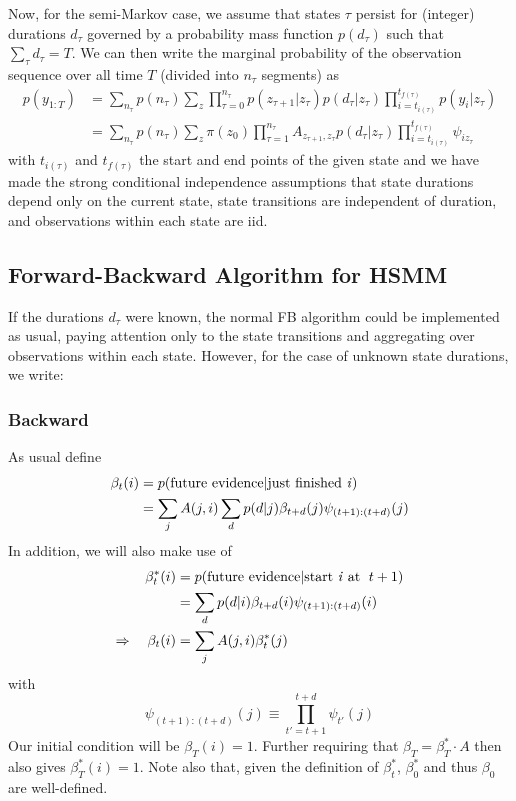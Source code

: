 \documentclass[11pt]{article}
\begin{document}
Now, for the semi-Markov case, we assume that states $\tau$ persist for (integer) durations $d_\tau$ governed by a probability mass function $p(d_\tau)$ such that $\sum_{\tau} d_{\tau} = T$. We can then write the marginal probability of the observation sequence over all time $T$ (divided into $n_\tau$ segments) as
\begin{align}
    p(y_{1:T}) &= \sum_{n_\tau} p(n_\tau)\sum_z \prod_{\tau = 0}^{n_\tau} p(z_{\tau+1}|z_\tau) p(d_{\tau}|z_{\tau})
    \prod_{i = t_{i(\tau)}}^{t_{f(\tau)}} p(y_i|z_\tau) \\
    &= \sum_{n_\tau} p(n_\tau) \sum_z \pi(z_0) \prod_{\tau = 1}^{n_\tau} A_{z_{\tau+1}, z_{\tau}} p(d_{\tau}|z_{\tau})\prod_{i = t_{i(\tau)}}^{t_{f(\tau)}} \psi_{iz_{\tau}}
\end{align}
with $t_{i(\tau)}$ and $t_{f(\tau)}$ the start and end points of the given state and we have made the strong conditional independence assumptions that state durations depend only on the current state, state transitions are independent of duration, and observations within each state are iid.

\subsection{Forward-Backward Algorithm for HSMM}
If the durations $d_\tau$ were known, the normal FB algorithm could be implemented as usual, paying attention only to the state transitions and aggregating over observations within each state. However, for the case of unknown state durations, we write:

\subsubsection{Backward}
As usual define
\begin{align}
    \beta_t(i) & = p(\text{future evidence}|\text{just finished \emph{i}}) \\
    &= \sum_j A(j, i) \sum_d p(d|j) \beta_{t + d}(j) \psi_{(t+1):(t+d)}(j)
\end{align} 
In addition, we will also make use of
\begin{align}
    \beta^*_t(i) & = p(\text{future evidence}|\text{start \emph{i} at \;} t + 1) \\
    &= \sum_d p(d|i) \beta_{t + d}(i) \psi_{(t+1):(t+d)}(i) \\
    \Rightarrow \quad
    \beta_t (i) &= \sum_j A(j, i) \beta_t^*(j)
\end{align} 
with 
\begin{equation}
    \psi_{(t + 1):(t + d)}(j) \equiv \prod_{t' = t + 1}^{t + d} \psi_{t'}(j)
\end{equation}
Our initial condition will be $\beta_T(i) = 1$. Further requiring that $\beta_T = \beta^*_T \cdot A$ then also gives $\beta^*_T(i) = 1$. Note also that, given the definition of $\beta^*_t$, $\beta^*_0$ and thus $\beta_0$ are well-defined.
\end{document}
